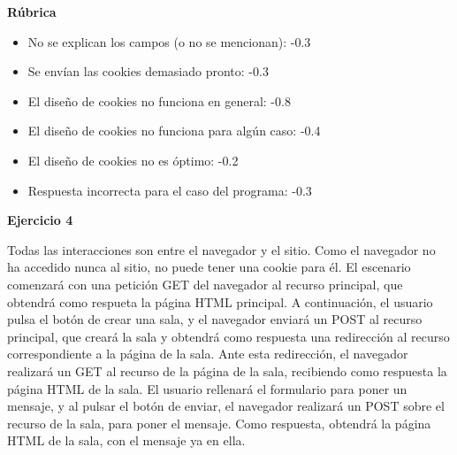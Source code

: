 \vspace{.4cm}\textbf{Rúbrica}

\begin{itemize}
\item No se explican los campos (o no se mencionan): -0.3
\item Se envían las cookies demasiado pronto: -0.3
\item El diseño de cookies no funciona en general: -0.8
\item El diseño de cookies no funciona para algún caso: -0.4
\item El diseño de cookies no es óptimo: -0.2
\item Respuesta incorrecta para el caso del programa: -0.3
\end{itemize}

\textbf{Ejercicio 4}

Todas las interacciones son entre el navegador y el sitio. Como el navegador no ha accedido nunca al sitio, no puede tener una cookie para él. El escenario comenzará con una petición GET del navegador al recurso principal, que obtendrá como respueta la página HTML principal. A continuación, el usuario pulsa el botón de crear una sala, y el navegador enviará un POST al recurso principal, que creará la sala y obtendrá como respuesta una redirección al recurso correspondiente a la página de la sala. Ante esta redirección, el navegador realizará un GET al recurso de la página de la sala, recibiendo como respuesta la página HTML de la sala. El usuario rellenará el formulario para poner un mensaje, y al pulsar el botón de enviar, el navegador realizará un POST sobre el recurso de la sala, para poner el mensaje. Como respuesta, obtendrá la página HTML de la sala, con el mensaje ya en ella.

